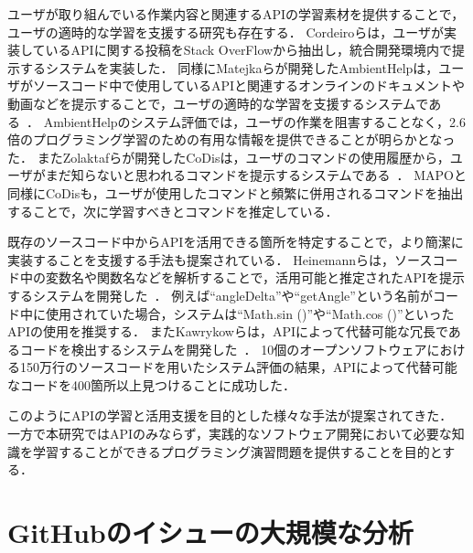 ユーザが取り組んでいる作業内容と関連するAPIの学習素材を提供することで，ユーザの適時的な学習を支援する研究も存在する．
Cordeiroらは，ユーザが実装しているAPIに関する投稿をStack OverFlowから抽出し，統合開発環境内で提示するシステムを実装した\cite{Cordeiro_2012_extract_QA_SO}．
同様にMatejkaらが開発したAmbientHelpは，ユーザがソースコード中で使用しているAPIと関連するオンラインのドキュメントや動画などを提示することで，ユーザの適時的な学習を支援するシステムである~\cite{Matejka_Ambient_Help}．
AmbientHelpのシステム評価では，ユーザの作業を阻害することなく，2.6倍のプログラミング学習のための有用な情報を提供できることが明らかとなった．
またZolaktafらが開発したCoDisは，ユーザのコマンドの使用履歴から，ユーザがまだ知らないと思われるコマンドを提示するシステムである~\cite{Zolaktaf_Recommending_Commands}．
MAPOと同様にCoDisも，ユーザが使用したコマンドと頻繁に併用されるコマンドを抽出することで，次に学習すべきとコマンドを推定している．

既存のソースコード中からAPIを活用できる箇所を特定することで，より簡潔に実装することを支援する手法も提案されている．
Heinemannらは，ソースコード中の変数名や関数名などを解析することで，活用可能と推定されたAPIを提示するシステムを開発した~\cite{Heinemann_Identifier_Based_API_Recommendation}．
例えば``angleDelta''や``getAngle''という名前がコード中に使用されていた場合，システムは``Math.sin ()''や``Math.cos ()''といったAPIの使用を推奨する．
またKawrykowらは，APIによって代替可能な冗長であるコードを検出するシステムを開発した~\cite{Kawrykow_Improving_API_Usage}．
10個のオープンソフトウェアにおける150万行のソースコードを用いたシステム評価の結果，APIによって代替可能なコードを400箇所以上見つけることに成功した．

このようにAPIの学習と活用支援を目的とした様々な手法が提案されてきた．
一方で本研究ではAPIのみならず，実践的なソフトウェア開発において必要な知識を学習することができるプログラミング演習問題を提供することを目的とする．


\section{GitHubのイシューの大規模な分析}

